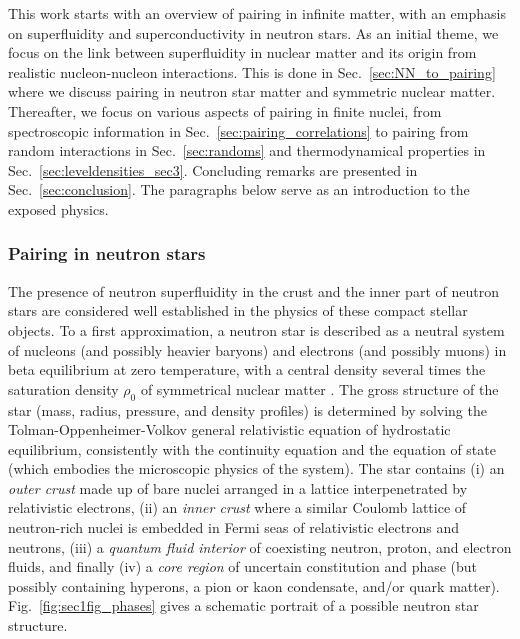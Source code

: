 \documentclass[rmp,preprint,aps,floatfix]{revtex4}
\begin{document}
This work starts with an overview of pairing in infinite matter, with an 
emphasis on superfluidity and superconductivity in neutron stars.
As an initial theme, we focus on the link between superfluidity 
in nuclear matter 
and its origin from realistic nucleon-nucleon interactions. 
This is done 
in Sec.~\ref{sec:NN_to_pairing} where we discuss pairing in neutron star
matter and symmetric nuclear matter.
Thereafter, we focus on various aspects of pairing in finite nuclei, from
spectroscopic information in Sec.~\ref{sec:pairing_correlations}
to pairing from random interactions in Sec.~\ref{sec:randoms}
and thermodynamical properties in Sec.~\ref{sec:leveldensities_sec3}.
Concluding remarks are presented in Sec.~\ref{sec:conclusion}.
The paragraphs below serve as an introduction to the  exposed physics.



\subsubsection{Pairing in neutron stars}
\label{subsubsect:neutron_stars}

The presence of neutron superfluidity in 
the crust and the inner part 
of neutron stars 
are considered well established 
in the physics of these compact stellar objects. 
To a first approximation, a neutron star 
is described as a neutral system of nucleons (and possibly heavier baryons) 
and electrons (and possibly muons) in beta equilibrium at zero temperature, 
with a central density several times the saturation density $\rho_0$ 
of symmetrical nuclear matter \cite{hh2000,pethick1992,shapiro,lamb,fiks,alparlives}. 
The gross structure of the star (mass, radius, pressure, and density 
profiles) is determined by solving the Tolman-Oppenheimer-Volkov general 
relativistic equation of hydrostatic equilibrium, consistently with 
the continuity equation and the equation of state (which embodies the 
microscopic physics of the system).  The star contains (i) an {\it outer 
crust} made up of bare nuclei arranged in a lattice interpenetrated 
by relativistic electrons, (ii) an {\it inner crust} where a similar 
Coulomb lattice of neutron-rich nuclei is embedded in Fermi seas of 
relativistic electrons and neutrons, (iii) a {\it quantum fluid interior} 
of coexisting neutron, proton, and electron fluids, and finally 
(iv) a {\it core region} of uncertain constitution and phase (but 
possibly containing hyperons, a pion or kaon condensate, and/or quark matter).
Fig.~\ref{fig:sec1fig_phases} gives a schematic portrait of a 
possible neutron star structure.
\end{document}
